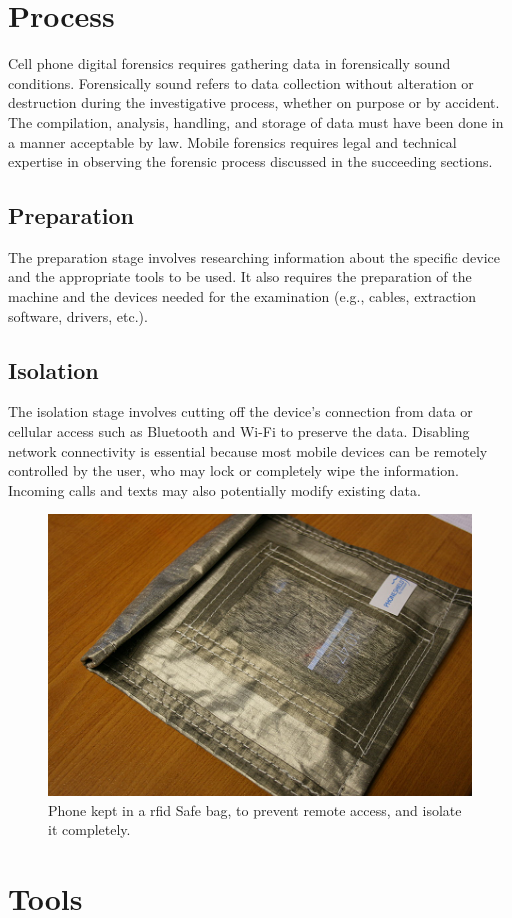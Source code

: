 \documentclass[11pt]{article}
\begin{document}
\section{Process}

Cell phone digital forensics requires gathering data in forensically sound conditions. Forensically sound refers to data collection without alteration or destruction during the investigative process, whether on purpose or by accident. The compilation, analysis, handling, and storage of data must have been done in a manner acceptable by law. Mobile forensics requires legal and technical expertise in observing the forensic process discussed in the succeeding sections.

\subsection{Preparation}
The preparation stage involves researching information about the specific device and the appropriate tools to be used. It also requires the preparation of the machine and the devices needed for the examination (e.g., cables, extraction software, drivers, etc.).

\subsection{Isolation}
The isolation stage involves cutting off the device's connection from data or cellular access such as Bluetooth and Wi-Fi to preserve the data. Disabling network connectivity is essential because most mobile devices can be remotely controlled by the user, who may lock or completely wipe the information. Incoming calls and texts may also potentially modify existing data.

\begin{figure}[H]
    \centering
    \includegraphics[width=.45\textwidth]{./1280px-rf_bag_with_iphone3829824308128555210.png}
    \caption{Phone kept in a rfid Safe bag, to prevent remote access, and isolate it completely. }
\end{figure}
\section{Tools}
\end{document}
